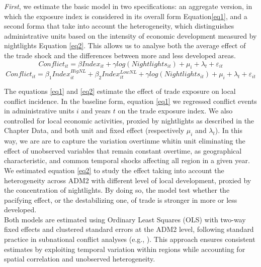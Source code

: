 \textit{First}, we estimate the basic model in two specifications: an aggregate version, in which the exposure index is considered in its overall form Equation\eqref{eq1}, and a second forma that take into account the heterogeneity, which distinguishes administrative units based on the intensity of economic development measured by nightlights Equation \eqref{eq2}. This allows us to analyse both the average effect of the trade shock and the differences between more and less developed areas.\\
\begin{equation}
	Conflict_{it} = \beta Index_{it} + \gamma log(Nightlights_{it}) + \mu_i + \lambda_t + \varepsilon_{it}
	\label{eq1}
\end{equation}
\begin{equation}
	Conflict_{it} = \beta_1 Index_{it}^{HigNL}+ \beta_2 Index_{it}^{LowNL}+ \gamma log(Nightlights_{it}) + \mu_i + \lambda_t + \varepsilon_{it}
	\label{eq2}
\end{equation}

The equations \ref{eq1} and \ref{eq2} estimate the effect of trade exposure on local conflict incidence. In the baseline form, equation \ref{eq1} we regressed conflict events in administrative units $i$ and years $t$ on the trade exposure index. We also controlled for local economic activities, proxied by nightlights as described in the Chapter Data, and both unit and fixed effect (respectively $\mu_i$ and $\lambda_t$). In this way, we are are to capture the variation overtinme whitin unit eliminating the effect of unobserved variables that remain constant overtime, as geographical characteristic, and common temporal shocks affecting all region in a given year. \\

We estimated equation \ref{eq2} to study the effect taking into account the heterogeneity across ADM2  with different level of local development, proxied by the concentration of nightlights. By doing so, the model test whether the pacifying effect, or the destabilizing one, of trade is stronger in more or less developed. \\

Both models are estimated using Ordinary Least Squares (OLS) with two-way fixed effects and clustered standard errors at the ADM2 level, following standard practice in subnational conflict analyses (e.g., \textcite{berman2015external, dube2013commodity}). This approach ensures consistent estimates by exploiting temporal variation within regions while accounting for spatial correlation and unobserved heterogeneity. \\

